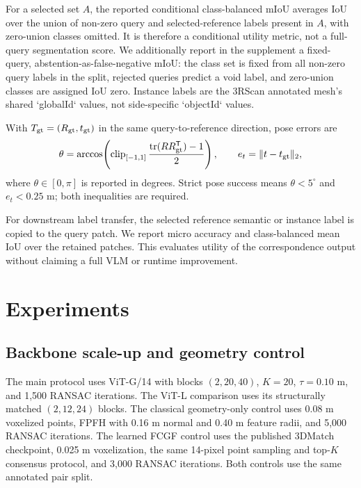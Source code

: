 \documentclass[10pt,twocolumn]{article}
\begin{document}
For a selected set $A$, the reported conditional class-balanced mIoU averages
IoU over the union of non-zero query and selected-reference labels present in
$A$, with zero-union classes omitted. It is therefore a conditional utility
metric, not a full-query segmentation score. We additionally report in the
supplement a fixed-query, abstention-as-false-negative mIoU: the class set is
fixed from all non-zero query labels in the split, rejected queries predict a
void label, and zero-union classes are assigned IoU zero. Instance labels are
the 3RScan annotated mesh's shared `globalId` values, not side-specific
`objectId` values.

With $T_{\rm gt}=(R_{\rm gt},t_{\rm gt})$ in the same query-to-reference
direction, pose errors are
\[
  \theta=\arccos\!\left(\operatorname{clip}_{[-1,1]}
  \frac{\operatorname{tr}(R R_{\rm gt}^{\mathsf T})-1}{2}\right),
  \qquad e_t=\|t-t_{\rm gt}\|_2,
\]
where $\theta\in[0,\pi]$ is reported in degrees. Strict pose success means
$\theta<5^\circ$ and $e_t<0.25$ m; both inequalities are required.

For downstream label transfer, the selected reference semantic or instance
label is copied to the query patch. We report micro accuracy and class-balanced
mean IoU over the retained patches. This evaluates utility of the correspondence
output without claiming a full VLM or runtime improvement.

\section{Experiments}

\subsection{Backbone scale-up and geometry control}
The main protocol uses ViT-G/14 with blocks $(2,20,40)$, $K=20$, $\tau=0.10$ m,
and 1,500 RANSAC iterations. The ViT-L comparison uses its structurally
matched $(2,12,24)$ blocks. The classical geometry-only control uses 0.08 m
voxelized points, FPFH with 0.16 m normal and 0.40 m feature radii, and 5,000
RANSAC iterations. The learned FCGF control uses the published 3DMatch
checkpoint, 0.025 m voxelization, the same 14-pixel point sampling and top-$K$
consensus protocol, and 3,000 RANSAC iterations. Both controls use the same
annotated pair split.
\end{document}
